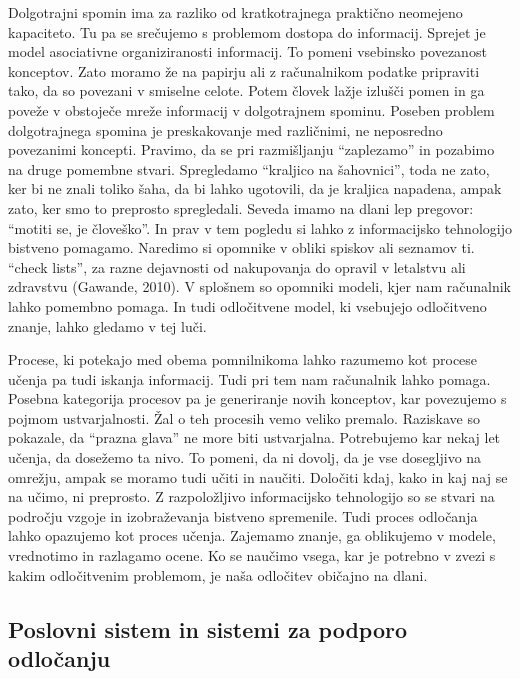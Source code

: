 Dolgotrajni spomin ima za razliko od kratkotrajnega praktično neomejeno kapaciteto. Tu pa se srečujemo s problemom dostopa do informacij. Sprejet je model asociativne organiziranosti informacij. To pomeni vsebinsko povezanost konceptov. Zato moramo že na papirju ali z računalnikom podatke pripraviti tako, da so povezani v smiselne celote. Potem človek lažje izlušči pomen in ga poveže v obstoječe mreže informacij v dolgotrajnem spominu. Poseben problem dolgotrajnega spomina je preskakovanje med različnimi, ne neposredno povezanimi koncepti. Pravimo, da se pri razmišljanju ``zaplezamo'' in pozabimo na druge pomembne stvari. Spregledamo ``kraljico na šahovnici'', toda ne zato, ker bi ne znali toliko šaha, da bi lahko ugotovili, da je kraljica napadena, ampak zato, ker smo to preprosto spregledali. Seveda imamo na dlani lep pregovor: ``motiti se, je človeško''. In prav v tem pogledu si lahko z informacijsko tehnologijo bistveno pomagamo. Naredimo si opomnike v obliki spiskov ali seznamov ti. ``check lists'', za razne dejavnosti od nakupovanja do opravil v letalstvu ali zdravstvu (Gawande, 2010). V splošnem so opomniki modeli, kjer nam računalnik lahko pomembno pomaga. In tudi odločitvene model, ki vsebujejo odločitveno znanje, lahko gledamo v tej luči.

Procese, ki potekajo med obema pomnilnikoma lahko razumemo kot procese učenja pa tudi iskanja informacij. Tudi pri tem nam računalnik lahko pomaga. Posebna kategorija procesov pa je generiranje novih konceptov, kar povezujemo s pojmom ustvarjalnosti. Žal o teh procesih vemo veliko premalo. Raziskave so pokazale, da ``prazna glava'' ne more biti ustvarjalna. Potrebujemo kar nekaj let učenja, da dosežemo ta nivo. To pomeni, da ni dovolj, da je vse dosegljivo na omrežju, ampak se moramo tudi učiti in naučiti. Določiti kdaj, kako in kaj naj se na učimo, ni preprosto. Z razpoložljivo informacijsko tehnologijo so se stvari na področju vzgoje in izobraževanja bistveno spremenile. Tudi proces odločanja lahko opazujemo kot proces učenja. Zajemamo znanje, ga oblikujemo v modele, vrednotimo in razlagamo ocene. Ko se naučimo vsega, kar je potrebno v zvezi s kakim odločitvenim problemom, je naša odločitev običajno na dlani.

\subsection{Poslovni sistem in sistemi za podporo odločanju}


